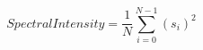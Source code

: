 \begin{equation}
\mathit{SpectralIntensity} = \frac{1}{N} \sum_{i=0}^{N-1} (s_i)^2
\label{eq:spectral_intensity}
\end{equation}
